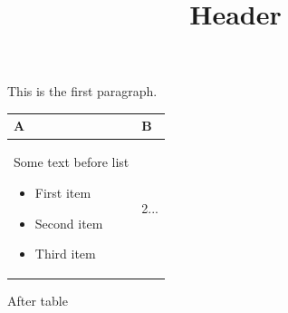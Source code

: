 \documentclass[11pt,a4paper]{article}
\title{Header}
\begin{document}
\maketitle

This is the first paragraph.

\begin{table}[h]
\begin{tabular}{|l|l|}
\hline
A & B \\ \hline
Some text before list  \begin{itemize} \item First item \item Second item \item Third item \end{itemize} & 2... \\ \hline
\end{tabular}
\end{table}

After table
\end{document}
